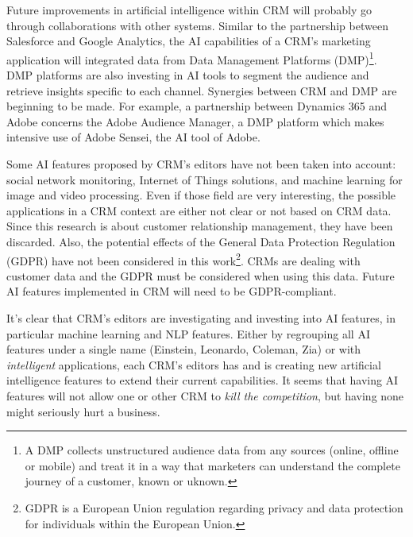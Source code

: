Future improvements in artificial intelligence within CRM will probably go through collaborations with other systems. Similar to the partnership between Salesforce and Google Analytics, the AI capabilities of a CRM's marketing application will integrated data from Data Management Platforms (DMP)\footnote{A DMP collects unstructured audience data from any sources (online, offline or mobile) and treat it in a way that marketers can understand the complete journey of a customer, known or uknown.}. DMP platforms are also investing in AI tools to segment the audience and retrieve insights specific to each channel. Synergies between CRM and DMP are beginning to be made. For example, a partnership between Dynamics 365 and Adobe concerns the Adobe Audience Manager, a DMP platform which makes intensive use of Adobe Sensei, the AI tool of Adobe.

Some AI features proposed by CRM's editors have not been taken into account: social network monitoring, Internet of Things solutions, and machine learning for image and video processing. Even if those field are very interesting, the possible applications in a CRM context are either not clear or not based on CRM data. Since this research is about customer relationship management, they have been discarded. Also, the potential effects of the General Data Protection Regulation (GDPR) have not been considered in this work\footnote{GDPR is a European Union regulation regarding privacy and data protection for individuals within the European Union.}.  CRMs are dealing with customer data and the GDPR must be considered when using this data. Future AI features implemented in CRM will need to be GDPR-compliant.

It's clear that CRM's editors are investigating and investing into AI features, in particular machine learning and NLP features. Either by regrouping all AI features under a single name (Einstein, Leonardo, Coleman, Zia) or with \textit{intelligent} applications, each CRM's editors has and is creating new artificial intelligence features to extend their current capabilities. It seems that having AI features will not allow one or other CRM to \textit{kill the competition}, but having none might seriously hurt a business.